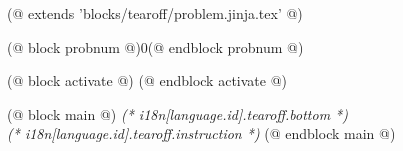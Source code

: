(@ extends 'blocks/tearoff/problem.jinja.tex' @)

(@ block probnum @)0(@ endblock probnum @)

(@ block activate @)
(@ endblock activate @)

(@ block main @)
    \centering
    \vspace*{(* competition.tearoff.bottomsep *)mm}
    \LARGE
    \textit{(* i18n[language.id].tearoff.bottom *)}
    \\[2mm]
    \small
    \textit{(* i18n[language.id].tearoff.instruction *)}
(@ endblock main @)
